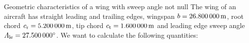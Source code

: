 \documentclass[[12pt,twoside]{book}
\begin{document}
\begin{myExampleX}{Geometric characteristics of a wing with sweep angle not null}{}%
\label{example:Geometric:Characteristics:Of:A:Wing:With:Sweep:Angle:Not:Null}
\noindent
The wing of an aircraft has straight leading and trailing edges, wingspan $b=\SI[round-precision=1]{\mySpanWingMT}{\metre}$,
root chord $c_\mathrm{r}=\SI[round-precision=2]{\myChordRootWingMT}{\metre}$, tip chord $c_\mathrm{t}=\SI[round-precision=2]{\myChordTipWingMT}{\metre}$
and leading edge sweep angle $\Lambda_\mathrm{le}=\SI[round-precision=1]{\myLambdaLEDeg}{\degree}$.
We want to calculate the following quantities:

\medskip


\end{myExampleX}
\end{document}
